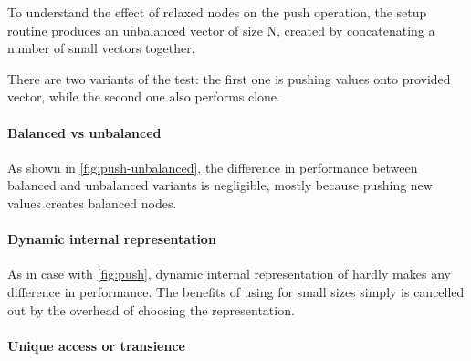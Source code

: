 \begin{figure}[t]
\end{figure}

To understand the effect of relaxed nodes on the push operation, the setup routine produces an unbalanced vector of size N, created by concatenating a number of small vectors together. 

There are two variants of the test: the first one is pushing values onto provided vector, while the second one also performs clone. 

\paragraph*{Balanced vs unbalanced} As shown in \ref{fig:push-unbalanced}, the difference in performance between balanced and unbalanced variants is negligible, mostly because pushing new values creates balanced nodes. 

\paragraph*{Dynamic internal representation}
As in case with \ref{fig:push}, dynamic internal representation of \pvec{} hardly makes any difference in performance. The benefits of using \stdvec{} for small sizes simply is cancelled out by the overhead of choosing the representation. 

\paragraph*{Unique access or transience}

